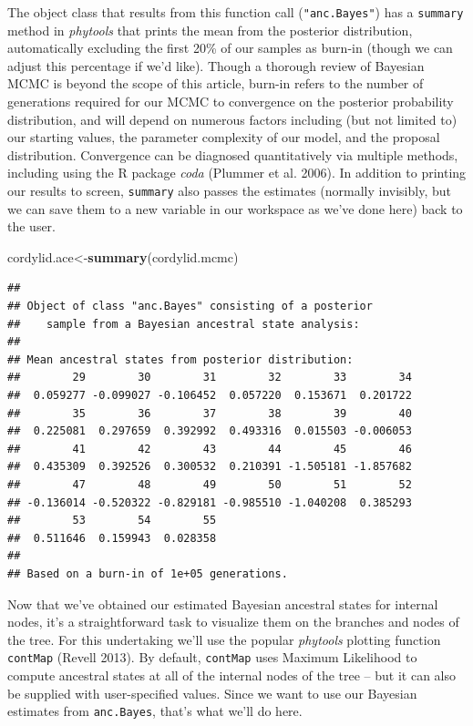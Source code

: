 \documentclass[fleqn,10pt,lineno]{wlpeerj} %
\newenvironment{Shaded}{\begin{snugshade}}{\end{snugshade}}
\newcommand{\FunctionTok}[1]{\textcolor[rgb]{0.13,0.29,0.53}{\textbf{#1}}}
\newcommand{\NormalTok}[1]{#1}
\newcommand{\OtherTok}[1]{\textcolor[rgb]{0.56,0.35,0.01}{#1}}
\begin{document}
The object class that results from this function call (\texttt{"anc.Bayes"}) has a \texttt{summary} method in \emph{phytools} that prints the mean from the posterior distribution, automatically excluding the first 20\% of our samples as burn-in (though we can adjust this percentage if we'd like). Though a thorough review of Bayesian MCMC is beyond the scope of this article, burn-in refers to the number of generations required for our MCMC to convergence on the posterior probability distribution, and will depend on numerous factors including (but not limited to) our starting values, the parameter complexity of our model, and the proposal distribution. Convergence can be diagnosed quantitatively via multiple methods, including using the R package \emph{coda} (Plummer et al. 2006). In addition to printing our results to screen, \texttt{summary} also passes the estimates (normally invisibly, but we can save them to a new variable in our workspace as we've done here) back to the user.

\begin{Shaded}
\begin{Highlighting}[]
\NormalTok{cordylid.ace}\OtherTok{\textless{}{-}}\FunctionTok{summary}\NormalTok{(cordylid.mcmc)}
\end{Highlighting}
\end{Shaded}

\begin{verbatim}
## 
## Object of class "anc.Bayes" consisting of a posterior
##    sample from a Bayesian ancestral state analysis:
## 
## Mean ancestral states from posterior distribution:
##        29        30        31        32        33        34 
##  0.059277 -0.099027 -0.106452  0.057220  0.153671  0.201722 
##        35        36        37        38        39        40 
##  0.225081  0.297659  0.392992  0.493316  0.015503 -0.006053 
##        41        42        43        44        45        46 
##  0.435309  0.392526  0.300532  0.210391 -1.505181 -1.857682
##        47        48        49        50        51        52
## -0.136014 -0.520322 -0.829181 -0.985510 -1.040208  0.385293
##        53        54        55 
##  0.511646  0.159943  0.028358 
## 
## Based on a burn-in of 1e+05 generations.
\end{verbatim}

Now that we've obtained our estimated Bayesian ancestral states for internal nodes, it's a straightforward task to visualize them on the branches and nodes of the tree. For this undertaking we'll use the popular \emph{phytools} plotting function \texttt{contMap} (Revell 2013). By default, \texttt{contMap} uses Maximum Likelihood to compute ancestral states at all of the internal nodes of the tree -- but it can also be supplied with user-specified values. Since we want to use our Bayesian estimates from \texttt{anc.Bayes}, that's what we'll do here.
\end{document}

